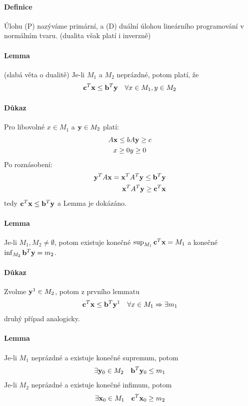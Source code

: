 \documentclass[a4paper,12pt,titlepage]{article}
\begin{document}
\paragraph{Definice}
Úlohu (P) nazýváme primární, a (D) duální úlohou lineárního programování v
normálním tvaru. (dualita však platí i inverzně)
\paragraph{Lemma} (slabá věta o dualitě)
Je-li $M_1$ a $M_2$ neprázdné, potom platí, že
\begin{align}
	\mathbf{c}^T \mathbf{x} \le \mathbf{b}^T\mathbf{y} \quad \forall x \in M_1, y \in M_2
\end{align}
\paragraph{Důkaz}
Pro libovolné $x \in M_1$ a $\mathbf{y} \in M_2$ platí:
\begin{align}
	A\mathbf{x} \le b & A\mathbf{y} \ge c \\
	x\ge 0 & y \ge 0
\end{align}
Po roznásobení:
\begin{align}
	\mathbf{y}^T A \mathbf{x} = \mathbf{x}^T A^T \mathbf{y} \le \mathbf{b}^T \mathbf{y} \\
	\mathbf{x}^T A^T \mathbf{y} \ge \mathbf{c}^T \mathbf{x}
\end{align}
tedy $\mathbf{c}^T\mathbf{x} \le \mathbf{b}^T \mathbf{y}$ a Lemma je dokázáno.
\paragraph{Lemma}
Je-li $M_1, M_2 \neq \emptyset$, potom existuje konečné $\sup_{M_1} \mathbf{c}^T\mathbf{x} =
M_1$ a konečné $\inf_{M_2} \mathbf{b}^T \mathbf{y} = m_2$.
\paragraph{Důkaz}
Zvolme $\mathbf{y}^1 \in M_2$, potom z prvního lemmatu 
\begin{align}
	\mathbf{c}^T \mathbf{x} \le \mathbf{b}^T \mathbf{y}^1 \quad \forall x \in M_1 \Rightarrow \exists m_1
\end{align}
druhý případ analogicky.
\paragraph{Lemma}
Je-li $M_1$ neprázdné a existuje konečné supremum, potom
\begin{align}
	\exists \mathbf{y}_0 \in M_2 \quad \mathbf{b}^T\mathbf{y}_0 \le m_1
\end{align}
Je-li $M_2$ neprázdné a existuje konečné infimum, potom
\begin{align}
	\exists \mathbf{x}_0 \in M_1 \quad \mathbf{c}^T\mathbf{x}_0 \ge m_2
\end{align}
\end{document}
